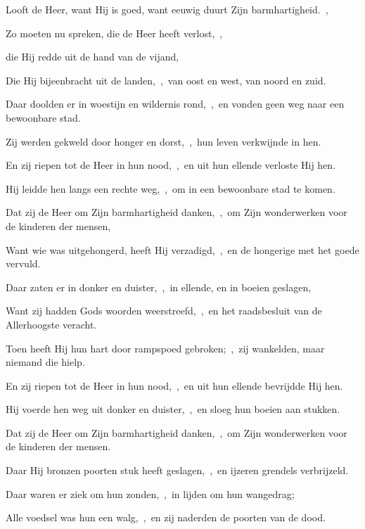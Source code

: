 \documentclass[12pt,twoside,a5paper]{article}
\begin{document}
\begin{halfparskip}

   Looft de Heer, want Hij is goed, want eeuwig duurt Zijn barmhartigheid.~\sep

  Zo moeten nu spreken, die de Heer heeft verlost,~\sep


  die Hij redde uit de hand van de vijand,

  Die Hij bijeenbracht uit de landen,~\sep\ van oost en west, van noord en zuid.

  Daar doolden er in woestijn en wildernis rond,~\sep\ en vonden geen weg naar een bewoonbare stad.

  Zij werden gekweld door honger en dorst,~\sep\ hun leven verkwijnde in hen.

  En zij riepen tot de Heer in hun nood,~\sep\ en uit hun ellende verloste Hij hen.

  Hij leidde hen langs een rechte weg,~\sep\ om in een bewoonbare stad te komen.

  Dat zij de Heer om Zijn barmhartigheid danken,~\sep\ om Zijn wonderwerken voor de kinderen der mensen,

  Want wie was uitgehongerd, heeft Hij verzadigd,~\sep\ en de hongerige met het goede vervuld.

  Daar zaten er in donker en duister,~\sep\ in ellende, en in boeien geslagen,

  Want zij hadden Gods woorden weerstreefd,~\sep\ en het raadsbesluit van de Allerhoogste veracht.

  Toen heeft Hij hun hart door rampspoed gebroken;~\sep\ zij wankelden, maar niemand die hielp.

  En zij riepen tot de Heer in hun nood,~\sep\ en uit hun ellende bevrijdde Hij hen.

  Hij voerde hen weg uit donker en duister,~\sep\ en sloeg hun boeien aan stukken.

  Dat zij de Heer om Zijn barmhartigheid danken,~\sep\ om Zijn wonderwerken voor de kinderen der mensen.

  Daar Hij bronzen poorten stuk heeft geslagen,~\sep\ en ijzeren grendels verbrijzeld.

  Daar waren er ziek om hun zonden,~\sep\ in lijden om hun wangedrag;

  Alle voedsel was hun een walg,~\sep\ en zij naderden de poorten van de dood.


\end{halfparskip}
\end{document}
